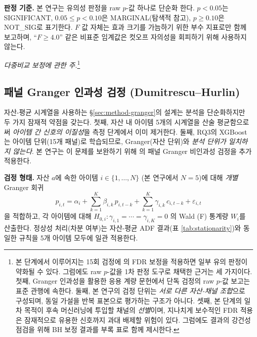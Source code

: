 \documentclass[11pt, a4paper, twocolumn]{article}
\begin{document}
\textbf{판정 기준.} 본 연구는 유의성 판정을 raw $p$-값 하나로 단순화
한다. $p<0.05$는 SIGNIFICANT, $0.05\leq p<0.10$은 MARGINAL(탐색적
참고), $p\geq 0.10$은 NOT\_SIG로 표기한다. $F$ 값 자체는 효과 크기를
가늠하기 위한 부수 지표로만 함께 보고하며, ``$F \geq 4.0$'' 같은 비표준
임계값은 컷오프 자의성을 회피하기 위해 사용하지 않는다.

\noindent\textit{다중비교 보정에 관한 주.}\footnote{본 단계에서
이루어지는 15회 검정에 \citet{benjaminihochberg1995}의 FDR 보정을
적용하면 일부 유의 판정이 약화될 수 있다. 그럼에도 raw $p$-값을 1차
판정 도구로 채택한 근거는 세 가지이다. 첫째, Granger 인과성을 활용한
응용 계량 문헌에서 단독 검정의 raw $p$-값 보고는 표준 관행에 속한다.
둘째, 본 연구의 검정 단위는 \emph{서로 다른 자산-채널 조합}으로
구성되며, 동일 가설을 반복 표본으로 평가하는 구조가 아니다. 셋째, 본
단계의 일차 목적이 후속 머신러닝에 투입할 채널의 \emph{선별}이며,
지나치게 보수적인 FDR 적용은 잠재적으로 유용한 신호까지 과대 배제할
위험이 있다. 그럼에도 결과의 강건성 점검을 위해 BH 보정 결과를
부록 표로 함께 제시한다.}

\subsection{패널 Granger 인과성 검정 (Dumitrescu--Hurlin)}\label{sec:method-dh}

자산-평균 시계열을 사용하는 \S\ref{sec:method-granger}의 설계는 분석을
단순화하지만 두 가지 잠재적 약점을 갖는다. 첫째, 자산 내 아이템 5개의
시계열을 산술 평균함으로써 \emph{아이템 간 신호의 이질성}을 측정 단계에서
이미 제거한다. 둘째, RQ3의 XGBoost는 아이템 단위(15개 패널)로 학습되므로,
Granger(자산 단위)와 \emph{분석 단위가 일치하지 않는다}. 본 연구는 이
문제를 보완하기 위해 \citet{dumitrescuhurlin2012}의 패널 Granger 비인과성
검정을 추가 적용한다.

\textbf{검정 형태.} 자산 $a$에 속한 아이템 $i \in \{1,\ldots,N\}$ (본
연구에서 $N=5$)에 대해 \emph{개별} Granger 회귀
\begin{equation}
  p_{i,t} = \alpha_i + \sum_{k=1}^{K} \beta_{i,k}\, p_{i,t-k}
         + \sum_{k=1}^{K} \gamma_{i,k}\, c_{i,t-k} + \varepsilon_{i,t}
\end{equation}
을 적합하고, 각 아이템에 대해 $H_{0,i}\colon\gamma_{i,1}=\cdots=\gamma_{i,K}=0$
의 Wald (F) 통계량 $W_i$를 산출한다. 정상성 처리(차분 여부)는 자산-평균
ADF 결과(표 \ref{tab:stationarity})와 동일한 규칙을 5개 아이템 모두에
일관 적용한다.
\end{document}

